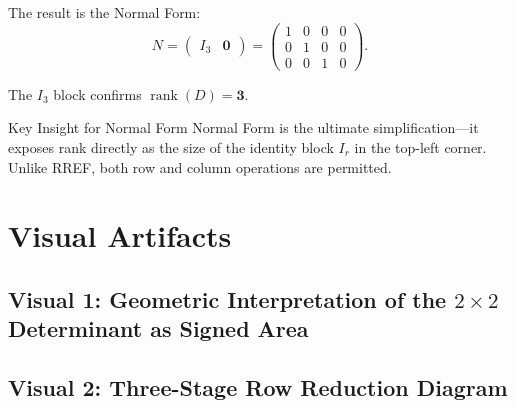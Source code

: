 \documentclass[12pt,a4paper]{article}
\begin{document}
The result is the Normal Form:
\[
N = \begin{pmatrix} I_3 & \mathbf{0} \end{pmatrix}
= \begin{pmatrix} 1 & 0 & 0 & 0 \\ 0 & 1 & 0 & 0 \\ 0 & 0 & 1 & 0 \end{pmatrix}.
\]

The $I_3$ block confirms $\operatorname{rank}(D) = \mathbf{3}$.

\begin{learnbox}{Key Insight for Normal Form}
Normal Form is the ultimate simplification---it exposes rank directly as the size of the identity block $I_r$ in the top-left corner. Unlike RREF, both row and column operations are permitted.
\end{learnbox}

\section{Visual Artifacts}

\subsection*{Visual 1: Geometric Interpretation of the $2\times2$ Determinant as Signed Area}

\begin{center}
\end{center}

\subsection*{Visual 2: Three-Stage Row Reduction Diagram}
\end{document}
